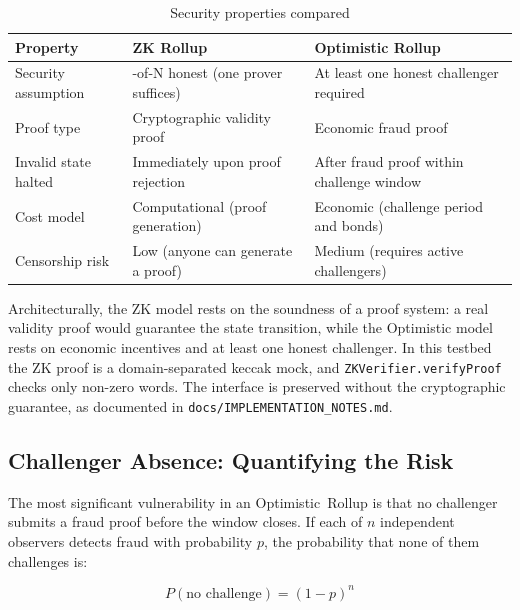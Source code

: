 \begin{table}[htbp]
    \centering
    \small
    \setlength{\tabcolsep}{3pt}
    \renewcommand{\arraystretch}{1.05}
    \begin{tabular}{@{}>{\raggedright\arraybackslash}p{3.3cm}|>{\raggedright\arraybackslash}p{4.7cm}|>{\raggedright\arraybackslash}p{5.2cm}@{}}
        \hline
        \textbf{Property} & \textbf{ZK Rollup} & \textbf{Optimistic Rollup} \\
        \hline
        Security assumption & 1-of-N honest (one prover suffices) & At least one honest challenger required \\
        \hline
        Proof type & Cryptographic validity proof & Economic fraud proof \\
        \hline
        Invalid state halted & Immediately upon proof rejection & After fraud proof within challenge window \\
        \hline
        Cost model & Computational (proof generation) & Economic (challenge period and bonds) \\
        \hline
        Censorship risk & Low (anyone can generate a proof) & Medium (requires active challengers) \\
        \hline
    \end{tabular}
    \caption{Security properties compared}
    \label{tab:security-models}
\end{table}

Architecturally, the ZK model rests on the soundness of a proof system: a real validity proof would guarantee the state transition, while the Optimistic model rests on economic incentives and at least one honest challenger. In this testbed the ZK proof is a domain-separated keccak mock, and \texttt{ZKVerifier.verifyProof} checks only non-zero words. The interface is preserved without the cryptographic guarantee, as documented in \texttt{docs/IMPLEMENTATION\_NOTES.md}.

\subsection{Challenger Absence: Quantifying the Risk}
\label{sec:challenger-absence}

The most significant vulnerability in an Optimistic~Rollup is that no challenger submits a fraud proof before the window closes. If each of $n$ independent observers detects fraud with probability $p$, the probability that none of them challenges is:

\begin{equation}
P(\text{no challenge}) = (1 - p)^n
\end{equation}

